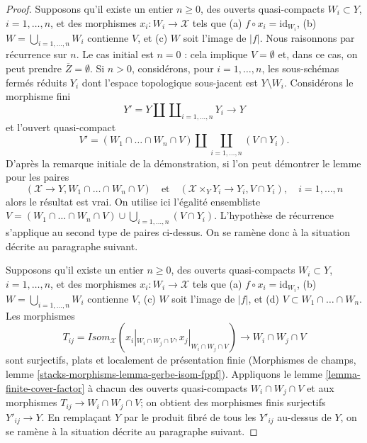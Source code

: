 \begin{proof}
\medskip\noindent
Supposons qu'il existe un entier $n \geq 0$, des ouverts quasi-compacts
$W_i \subset Y$, $i = 1, \ldots, n$, et des
morphismes $x_i : W_i \to \mathcal{X}$ tels que
(a) $f \circ x_i = \text{id}_{W_i}$,
(b) $W = \bigcup_{i = 1, \ldots, n} W_i$ contienne $V$, et
(c) $W$ soit l'image de $|f|$.
Nous raisonnons par récurrence sur $n$. Le cas initial est $n = 0$ : cela
implique $V = \emptyset$ et, dans ce cas, on peut prendre
$\overline{Z} = \emptyset$.
Si $n > 0$, considérons, pour $i = 1, \ldots, n$,
les sous-schémas fermés réduits
$Y_i$ dont l'espace topologique sous-jacent est
$Y \setminus W_i$. Considérons le morphisme fini
$$
Y' = Y \amalg \coprod\nolimits_{i = 1, \ldots, n} Y_i \longrightarrow Y
$$
et l'ouvert quasi-compact
$$
V' = (W_1 \cap \ldots \cap W_n \cap V) \amalg
\coprod_{i = 1, \ldots, n} (V \cap Y_i).
$$
D'après la remarque initiale de la démonstration, si l'on peut démontrer le lemme pour les paires
$$
(\mathcal{X} \to Y, W_1 \cap \ldots \cap W_n \cap V)
\quad\text{et}\quad
(\mathcal{X} \times_Y Y_i \to Y_i, V \cap Y_i),\quad
i = 1, \ldots, n
$$
alors le résultat est vrai. On utilise ici l'égalité ensembliste
$V = (W_1 \cap \ldots \cap W_n \cap V) \cup
\bigcup\nolimits_{i = 1, \ldots, n} (V \cap Y_i)$.
L'hypothèse de récurrence s'applique au second type de
paires ci-dessus. On se ramène donc à la situation décrite au
paragraphe suivant.

\medskip\noindent
Supposons qu'il existe un entier $n \geq 0$, des ouverts quasi-compacts
$W_i \subset Y$, $i = 1, \ldots, n$, et des
morphismes $x_i : W_i \to \mathcal{X}$ tels que
(a) $f \circ x_i = \text{id}_{W_i}$,
(b) $W = \bigcup_{i = 1, \ldots, n} W_i$ contienne $V$,
(c) $W$ soit l'image de $|f|$, et
(d) $V \subset W_1 \cap \ldots \cap W_n$.
Les morphismes
$$
T_{ij} = \mathit{Isom}_\mathcal{X}(x_i|_{W_i \cap W_j \cap V},
x_j|_{W_i \cap W_j \cap V}) \longrightarrow W_i \cap W_j \cap V
$$
sont surjectifs, plats et localement de présentation finie
(Morphismes de champs, lemme \ref{stacks-morphisms-lemma-gerbe-isom-fppf}).
Appliquons le lemme \ref{lemma-finite-cover-factor}
à chacun des ouverts quasi-compacts $W_i \cap W_j \cap V$ et aux morphismes
$T_{ij} \to W_i \cap W_j \cap V$; on obtient des morphismes finis surjectifs
$Y'_{ij} \to Y$. En remplaçant $Y$ par le produit fibré de tous
les $Y'_{ij}$ au-dessus de $Y$, on se ramène à la situation décrite
au paragraphe suivant.


\end{proof}
